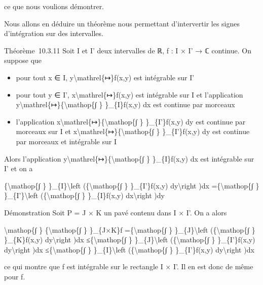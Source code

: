 \documentclass[]{article}
\begin{document}
ce que nous voulions démontrer.

Nous allons en déduire un théorème nous permettant d'intervertir les
signes d'intégration sur des intervalles.

Théorème~10.3.11 Soit I et I' deux intervalles de ℝ, f : I × I' → ℂ
continue. On suppose que

\begin{itemize}
\itemsep1pt\parskip0pt
\item
  pour tout x ∈ I, y\textbackslash{}mathrel\{↦\}f(x,y) est intégrable
  sur I'
\item
  pour tout y ∈ I', x\textbackslash{}mathrel\{↦\}f(x,y) est intégrable
  sur I et l'application
  y\textbackslash{}mathrel\{↦\}\{\textbackslash{}mathop\{∫ \}
  \}\_\{I\}f(x,y) dx est continue par morceaux
\item
  l'application x\textbackslash{}mathrel\{↦\}\{\textbackslash{}mathop\{∫
  \} \}\_\{I'\}f(x,y) dy est continue par morceaux sur I et
  x\textbackslash{}mathrel\{↦\}\{\textbackslash{}mathop\{∫ \}
  \}\_\{I'\}\textbar{}f(x,y)\textbar{} dy est continue par morceaux et
  intégrable sur I
\end{itemize}

Alors l'application
y\textbackslash{}mathrel\{↦\}\{\textbackslash{}mathop\{∫ \}
\}\_\{I\}f(x,y) dx est intégrable sur I' et on a

\{\textbackslash{}mathop\{∫ \} \}\_\{I\}\textbackslash{}left
(\{\textbackslash{}mathop\{∫ \} \}\_\{I'\}f(x,y) dy\textbackslash{}right
)dx =\{\textbackslash{}mathop\{∫ \} \}\_\{I'\}\textbackslash{}left
(\{\textbackslash{}mathop\{∫ \} \}\_\{I\}f(x,y) dx\textbackslash{}right
)dy

Démonstration Soit P = J × K un pavé contenu dans I × I'. On a alors

\textbackslash{}mathop\{∫ \} \{\textbackslash{}mathop\{∫ \}
\}\_\{J×K\}\textbar{}f\textbar{} =\{\textbackslash{}mathop\{∫ \}
\}\_\{J\}\textbackslash{}left (\{\textbackslash{}mathop\{∫ \}
\}\_\{K\}\textbar{}f(x,y)\textbar{} dy\textbackslash{}right )dx
≤\{\textbackslash{}mathop\{∫ \} \}\_\{J\}\textbackslash{}left
(\{\textbackslash{}mathop\{∫ \} \}\_\{I'\}\textbar{}f(x,y)\textbar{}
dy\textbackslash{}right )dx ≤\{\textbackslash{}mathop\{∫ \}
\}\_\{I\}\textbackslash{}left (\{\textbackslash{}mathop\{∫ \}
\}\_\{I'\}\textbar{}f(x,y)\textbar{} dy\textbackslash{}right )dx

ce qui montre que \textbar{}f\textbar{} est intégrable sur le rectangle
I × I'. Il en est donc de même pour f.
\end{document}

